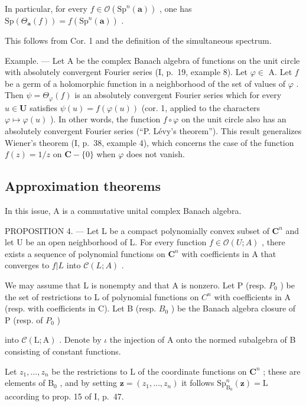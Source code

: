 In particular, for every \(f \in \mathcal{O}(\mathrm{Sp}^n(\boldsymbol{a}))\) , one has \(\mathrm{Sp}(\Theta_{\boldsymbol{a}}(f)) = f(\mathrm{Sp}^n(\boldsymbol{a}))\) .

This follows from Cor. 1 and the definition of the simultaneous spectrum.

Example. --- Let A be the complex Banach algebra of functions on the unit circle with absolutely convergent Fourier series (I, p.~19, example 8). Let \(\varphi \in\) A. Let \(f\) be a germ of a holomorphic function in a neighborhood of the set of values of \(\varphi\) . Then \(\psi = \Theta_{\varphi}(f)\) is an absolutely convergent Fourier series which for every \(u \in \mathbf{U}\) satisfies \(\psi(u) = f(\varphi(u))\) (cor. 1, applied to the characters \(\varphi \mapsto \varphi(u)\) ). In other words, the function \(f \circ \varphi\) on the unit circle also has an absolutely convergent Fourier series (“P. Lévy’s theorem”). This result generalizes Wiener’s theorem (I, p.~38, example 4), which concerns the case of the function \(f(z) = 1/z\) on \(\mathbf{C} - \{0\}\) when \(\varphi\) does not vanish.

\subsection{Approximation theorems}

In this issue, A is a commutative unital complex Banach algebra.

PROPOSITION 4. --- Let L be a compact polynomially convex subset of \(\mathbf{C}^{n}\) and let U be an open neighborhood of L. For every function \(f\in\mathcal{O}(U;A)\) , there exists a sequence of polynomial functions on \(\mathbf{C}^{n}\) with coefficients in A that converges to \(f|L\) into \(\mathcal{C}(L;A)\) .

We may assume that L is nonempty and that A is nonzero. Let P (resp. \(P_{0}\) ) be the set of restrictions to L of polynomial functions on \(C^{n}\) with coefficients in A (resp. with coefficients in C). Let B (resp. \(B_{0}\) ) be the Banach algebra closure of P (resp. of \(P_{0}\) )

into \(\mathcal{C}(\mathrm{L};\mathrm{A})\) . Denote by \(\iota\) the injection of A onto the normed subalgebra of B consisting of constant functions.

Let \(z_{1},\ldots,z_{n}\) be the restrictions to L of the coordinate functions on \(\mathbf{C}^{n}\) ; these are elements of \(\mathrm{B}_{0}\) , and by setting \(\boldsymbol{z}=(z_{1},\ldots,z_{n})\) it follows \(\mathrm{Sp}_{\mathrm{B}_{0}}^{n}(\boldsymbol{z})=\mathrm{L}\) according to prop. 15 of I, p.~47.

